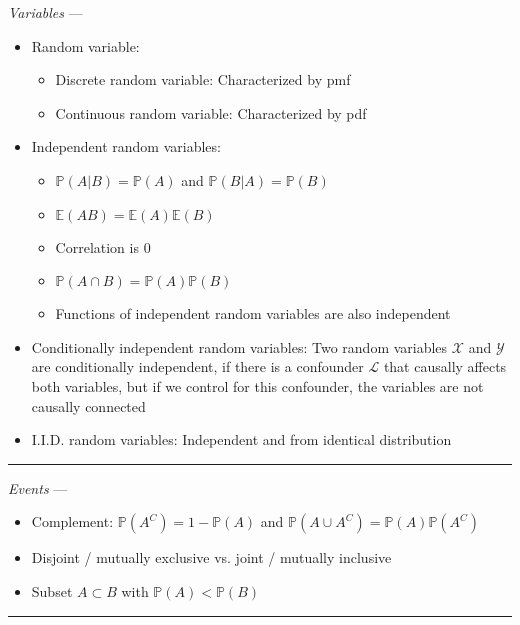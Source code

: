\emph{Variables} --- 
\begin{itemize}
    \item Random variable:
    \begin{itemize}
        \item Discrete random variable: Characterized by pmf
        \item Continuous random variable: Characterized by pdf
    \end{itemize}
    \item Independent random variables:
    \begin{itemize}
        \item $\mathbb{P}(A|B) = \mathbb{P}(A)$ and $\mathbb{P}(B|A) = \mathbb{P}(B)$
        \item $\mathbb{E}(AB) = \mathbb{E}(A)\mathbb{E}(B)$
        \item Correlation is 0 
        \item $\mathbb{P}(A \cap B) = \mathbb{P}(A)\mathbb{P}(B)$
        \item Functions of independent random variables are also independent
    \end{itemize}
    \item Conditionally independent random variables: Two random variables $\mathcal{X}$ and $\mathcal{Y}$ are conditionally independent, if there is a confounder $\mathcal{L}$ that causally affects both variables, but if we control for this confounder, the variables are not causally connected
    \item I.I.D. random variables: Independent and from identical distribution
\end{itemize}

{\color{lightgray}\hrule height 0.001mm}

\emph{Events} --- 
\begin{itemize}
    \item Complement: $\mathbb{P}(A^C) = 1 - \mathbb{P}(A)$ and $\mathbb{P}(A \cup A^C) = \mathbb{P}(A)\mathbb{P}(A^C)$
    \item Disjoint / mutually exclusive vs. joint / mutually inclusive
    \item Subset $A \subset B$ with $\mathbb{P}(A) < \mathbb{P}(B)$
\end{itemize}

{\color{lightgray}\hrule height 0.001mm}

